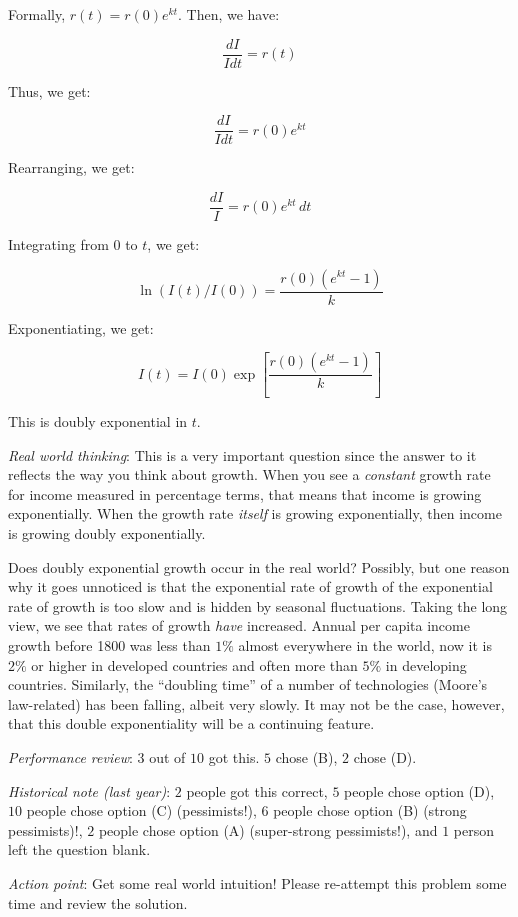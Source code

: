 \documentclass[10pt]{amsart}
\begin{document}
\begin{enumerate}
  Formally, $r(t) = r(0)e^{kt}$. Then, we have:

  $$\frac{dI}{I dt} = r(t)$$

  Thus, we get:

  $$\frac{dI}{Idt} = r(0)e^{kt}$$

  Rearranging, we get:

  $$\frac{dI}{I} = r(0)e^{kt} \, dt$$

  Integrating from $0$ to $t$, we get:

  $$\ln(I(t)/I(0)) = \frac{r(0)(e^{kt} - 1)}{k}$$

  Exponentiating, we get:

  $$I(t) = I(0)\exp[\frac{r(0)(e^{kt} - 1)}{k}]$$

  This is doubly exponential in $t$.

  {\em Real world thinking}: This is a very important question since
  the answer to it reflects the way you think about growth. When you
  see a {\em constant} growth rate for income measured in percentage
  terms, that means that income is growing exponentially. When the
  growth rate {\em itself} is growing exponentially, then income is
  growing doubly exponentially.

  Does doubly exponential growth occur in the real world? Possibly,
  but one reason why it goes unnoticed is that the exponential rate of
  growth of the exponential rate of growth is too slow and is hidden
  by seasonal fluctuations. Taking the long view, we see that rates of
  growth {\em have} increased. Annual per capita income growth before
  1800 was less than $1\%$ almost everywhere in the world, now it is
  $2\%$ or higher in developed countries and often more than $5\%$ in
  developing countries. Similarly, the ``doubling time'' of a number
  of technologies (Moore's law-related) has been falling, albeit very
  slowly. It may not be the case, however, that this double
  exponentiality will be a continuing feature.

  {\em Performance review}: $3$ out of $10$ got this. $5$ chose (B),
  $2$ chose (D).

  {\em Historical note (last year)}: $2$ people got this correct, $5$
  people chose option (D), $10$ people chose option (C) (pessimists!),
  $6$ people chose option (B) (strong pessimists)!, $2$ people chose
  option (A) (super-strong pessimists!), and $1$ person left the
  question blank.

  {\em Action point}: Get some real world intuition! Please re-attempt
  this problem some time and review the solution.
\end{enumerate}
\end{document}
